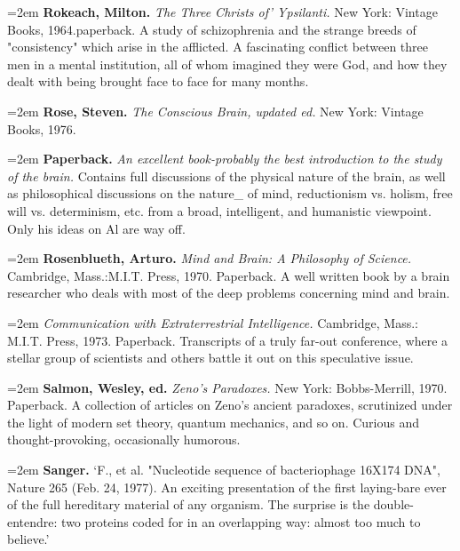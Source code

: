 \par\noindent\hangindent=2em {\bf Rokeach, Milton.} {\it The Three Christs of' Ypsilanti.} New York: Vintage Books, 1964.paperback. A study of schizophrenia and the strange breeds of "consistency" which arise in the afflicted. A fascinating conflict between three men in a mental institution, all of whom imagined they were God, and how they dealt with being brought face to face for many months.

\par\noindent\hangindent=2em {\bf Rose, Steven.} {\it The Conscious Brain, updated ed.} New York: Vintage Books, 1976.

\par\noindent\hangindent=2em {\bf Paperback.} {\it An excellent book-probably the best introduction to the study of the brain.} Contains full discussions of the physical nature of the brain, as well as philosophical discussions on the nature\_ of mind, reductionism vs. holism, free will vs. determinism, etc. from a broad, intelligent, and humanistic viewpoint. Only his ideas on Al are way off.

\par\noindent\hangindent=2em {\bf Rosenblueth, Arturo.} {\it Mind and Brain: A Philosophy of Science.} Cambridge, Mass.:M.I.T. Press, 1970. Paperback. A well written book by a brain researcher who deals with most of the deep problems concerning mind and brain.

\par\noindent\hangindent=2em  {\it Communication with Extraterrestrial Intelligence.} Cambridge, Mass.: M.I.T. Press, 1973. Paperback. Transcripts of a truly far-out conference, where a stellar group of scientists and others battle it out on this speculative issue.

\par\noindent\hangindent=2em {\bf Salmon, Wesley, ed.} {\it Zeno's Paradoxes.} New York: Bobbs-Merrill, 1970. Paperback. A collection of articles on Zeno's ancient paradoxes, scrutinized under the light of modern set theory, quantum mechanics, and so on. Curious and thought-provoking, occasionally humorous.

\par\noindent\hangindent=2em {\bf Sanger.} `F., et al. "Nucleotide sequence of bacteriophage 16X174 DNA", Nature 265 (Feb. 24, 1977). An exciting presentation of the first laying-bare ever of the full hereditary material of any organism. The surprise is the double-entendre: two proteins coded for in an overlapping way: almost too much to believe.' 

